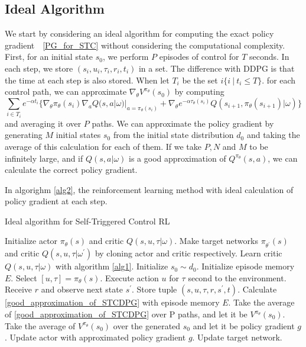 \documentclass[english, dvipdfmx]{ampmt}             %
\begin{document}
\subsection{Ideal Algorithm}
We start by considering an ideal algorithm for computing the exact policy gradient　\eqref{PG_for_STC} without considering the computational complexity. First, for an initial state $s_0$, we perform $P$ episodes of control for $T$ seconds.  In each step, we store $(s_i, u_i, \tau_i, r_i, t_i)$ in a set. The difference with DDPG is that the time at each step is also stored. When let $T_i$ be the set $ i\{i~|~t_i \leq T\}$. for each control path, we can approximate $\nabla_{\theta}V^{\pi_{\theta}}(s_0)$ by computing 
\begin{equation}
	\sum_{i\in T_i} e^{-\alpha t_i}\{\nabla_{\theta}\pi_{\theta}(s_i)\nabla_{a}Q(s,a|\omega)|_{a=\pi_{\theta}(s_i)} + \nabla_{\theta}e^{-\alpha\tau_{\theta}(s_{i})}Q(s_{i+1},\pi_{\theta}(s_{i+1})|\omega)\} \label{good_approximation_of_STCDPG} %
\end{equation}
and averaging it over $P$ paths. We can approximate the policy gradient by generating $M$ initial states $s_0$ from the initial state distribution $d_0$ and taking the average of this calculation for each of them. If we take $P, N$ and $M$ to be infinitely large, and if $Q(s,a|\omega)$ is a good approximation of $Q^{\pi_{\theta}}(s,a)$, we can calculate the correct policy gradient.\par
In algorighm \ref{alg2}, the reinforcement learning method with ideal calculation of policy gradient at each step. 
\begin{algorithm}                      
\caption{Ideal algorithm for Self-Triggered Control RL}         
\label{alg2}                          
\begin{algorithmic}                  
    \STATE Initialize actor $\pi_{\theta}(s)$ and critic $Q(s,u,\tau|\omega)$.
    \STATE Make target networks $\pi_{\theta^{\prime}}(s)$ and critic $Q(s,u,\tau|\omega^{\prime})$ by cloning actor and critic respectively.
    \STATE Learn critic $Q(s,u,\tau|\omega)$ with algorithm \ref{alg1}.
            \STATE Initialize $s_0\sim d_0$.
            \STATE Initialize episode memory $E$.
                \STATE Select $[u, \tau] = \pi_{\theta}(s)$.
                \STATE Execute action $u$ for $\tau$ second to the environment.
                \STATE Receive $r$ and observe next state $s^{\prime}$.
                \STATE Store tuple $(s, u, \tau, r, s^{\prime}, t)$.
            \ENDWHILE
            \STATE Calculate \eqref{good_approximation_of_STCDPG} with episode memory $E$.
        \ENDFOR
        \STATE Take the average of \eqref{good_approximation_of_STCDPG} over P paths, and let it be $V^{\pi_{\theta}}(s_0)$.
        \ENDFOR
    \ENDFOR
    \STATE Take the average of $V^{\pi_{\theta}}(s_0)$ over the generated $s_0$ and let it be policy gradient $g$.
    \STATE Update actor with approximated policy gradient $g$.
   \STATE Update target network.
   \end{algorithmic}
\end{algorithm}
\end{document}
